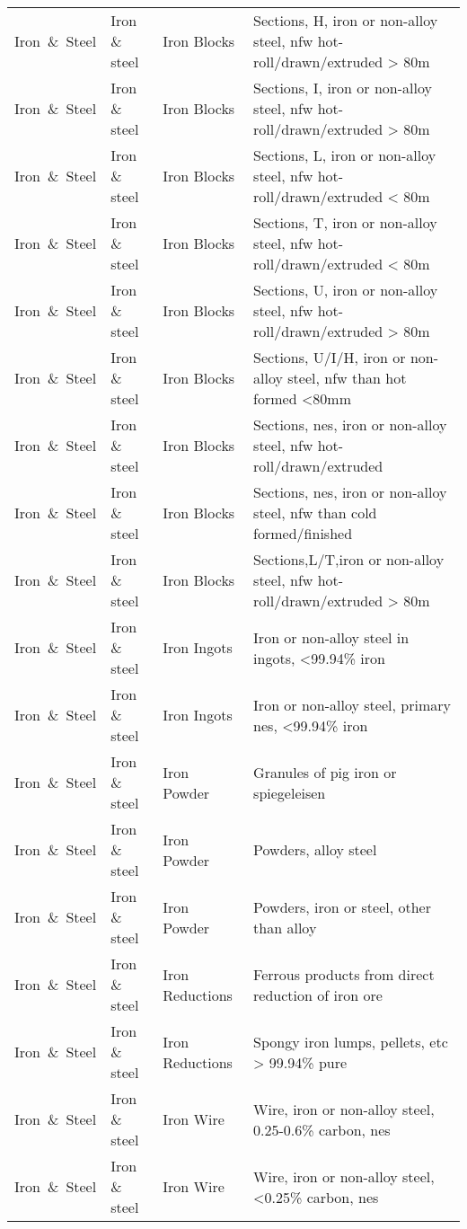 \begin{appendices}
\begin{xltabular}{\textwidth}{|p{0.07\textwidth}|p{0.12\textwidth}|p{0.20\textwidth}|p{0.5\textwidth}|}
Iron\ \&\ Steel & Iron \& steel & Iron Blocks & Sections, H, iron or non-alloy steel, nfw hot-roll/drawn/extruded > 80m \\
Iron\ \&\ Steel & Iron \& steel & Iron Blocks & Sections, I, iron or non-alloy steel, nfw hot-roll/drawn/extruded > 80m \\
Iron\ \&\ Steel & Iron \& steel & Iron Blocks & Sections, L, iron or non-alloy steel, nfw hot-roll/drawn/extruded < 80m \\
Iron\ \&\ Steel & Iron \& steel & Iron Blocks & Sections, T, iron or non-alloy steel, nfw hot-roll/drawn/extruded < 80m \\
Iron\ \&\ Steel & Iron \& steel & Iron Blocks & Sections, U, iron or non-alloy steel, nfw hot-roll/drawn/extruded > 80m \\
Iron\ \&\ Steel & Iron \& steel & Iron Blocks & Sections, U/I/H, iron or non-alloy steel, nfw than hot formed <80mm \\
Iron\ \&\ Steel & Iron \& steel & Iron Blocks & Sections, nes, iron or non-alloy steel, nfw hot-roll/drawn/extruded \\
Iron\ \&\ Steel & Iron \& steel & Iron Blocks & Sections, nes, iron or non-alloy steel, nfw than cold formed/finished \\
Iron\ \&\ Steel & Iron \& steel & Iron Blocks & Sections,L/T,iron or non-alloy steel, nfw hot-roll/drawn/extruded > 80m \\
Iron\ \&\ Steel & Iron \& steel & Iron Ingots & Iron or non-alloy steel in ingots, <99.94\% iron \\
Iron\ \&\ Steel & Iron \& steel & Iron Ingots & Iron or non-alloy steel, primary nes, <99.94\% iron \\
Iron\ \&\ Steel & Iron \& steel & Iron Powder & Granules of pig iron or spiegeleisen \\
Iron\ \&\ Steel & Iron \& steel & Iron Powder & Powders, alloy steel \\
Iron\ \&\ Steel & Iron \& steel & Iron Powder & Powders, iron or steel, other than alloy \\
Iron\ \&\ Steel & Iron \& steel & Iron Reductions & Ferrous products from direct reduction of iron ore \\
Iron\ \&\ Steel & Iron \& steel & Iron Reductions & Spongy iron lumps, pellets, etc > 99.94\% pure \\
Iron\ \&\ Steel & Iron \& steel & Iron Wire & Wire, iron or non-alloy steel, 0.25-0.6\% carbon, nes \\
Iron\ \&\ Steel & Iron \& steel & Iron Wire & Wire, iron or non-alloy steel, <0.25\% carbon, nes \\

\end{xltabular}
\end{appendices}
